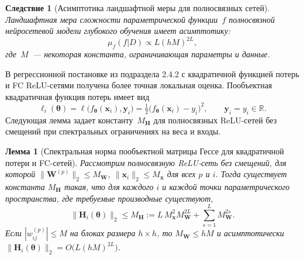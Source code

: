 \documentclass{dissert}
\newtheorem{lemma}[theorem]{Лемма}
\newtheorem{corollary}[theorem]{Следствие}
\begin{document}
\begin{corollary}[Асимптотика ландшафтной меры для полносвязных сетей]
Ландшафтная мера сложности параметрической функции~$f$ полносвязной нейросетевой модели глубокого обучения имеет асимптотику:
    \[
        \mu_f(f|D) \propto L(hM)^{2L},
    \]
    где~$M$~--- некоторая константа, ограничивающая параметры и данные.
\end{corollary}

В регрессионной постановке из подраздела 2.4.2 с квадратичной функцией потерь и FC ReLU-сетями получена более точная локальная оценка.
Пообъектная квадратичная функция потерь имеет вид
\begin{equation}\label{ch1lc:eq:loss-i}
  \ell_i(\boldsymbol{\theta})
  = \ell\bigl(f_{\boldsymbol{\theta}}(\mathbf{x}_i),\mathbf{y}_i\bigr)
  = \tfrac{1}{2}\bigl(f_{\boldsymbol{\theta}}(\mathbf{x}_i)-y_i\bigr)^2,
  \qquad \mathbf{y}_i = y_i\in\mathbb{R}.
\end{equation}
Следующая лемма задает константу~$M_{\mathbf{H}}$ для полносвязных ReLU-сетей без смещений при спектральных ограничениях на веса и входы.

\begin{lemma}[Спектральная норма пообъектной матрицы Гессе для квадратичной потери и FC-сетей]\label{ch1lc:lem:hess-mse}
Рассмотрим полносвязную ReLU-сеть без смещений, для которой
$\|\mathbf{W}^{(p)}\|_2 \le M_{\mathbf{W}}$, $\|\mathbf{x}_i\|_2 \le M_{\mathbf{x}}$ для всех $p$ и $i$.
Тогда существует константа $M_{\mathbf{H}}$ такая, что для каждого $i$ и каждой точки параметрического пространства, где требуемые производные существуют,
\begin{equation}\label{ch1lc:eq:Mh-bound}
  \bigl\| \mathbf{H}_i(\boldsymbol{\theta}) \bigr\|_2 \le M_{\mathbf{H}}
  := L\, M_{\mathbf{x}}^2 M_{\mathbf{W}}^{2L}
  + \sum_{s=1}^{L} M_{\mathbf{W}}^{2s} .
\end{equation}
Если $|w_{ij}^{(p)}|\le M$ на блоках размера $h\times h$, то $M_{\mathbf{W}}\le hM$ и асимптотически
$\|\mathbf{H}_i(\boldsymbol{\theta})\|_2 = O\!\bigl(L(hM)^{2L}\bigr)$.
\end{lemma}
\end{document}
